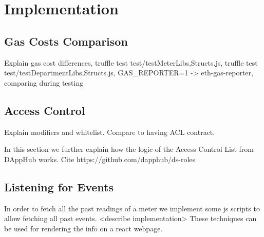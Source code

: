 \chapter{Implementation}

\section{Gas Costs Comparison}

Explain gas cost differences, truffle test test/testMeter{Libs,Structs}.js, truffle test test/testDepartment{Libs,Structs}.js, 
GAS_REPORTER=1 -> eth-gas-reporter, comparing during testing

\section{Access Control}\label{apx:implementation:acl}
Explain modifiers and whitelist. Compare to having ACL contract.

In this section we further explain how the logic of the Access Control List from DAppHub works. Cite  https://github.com/dapphub/ds-roles

\section{Listening for Events} \label{apx:implementation:events}

In order to fetch all the past readings of a meter we implement some js scripts to allow fetching all past events. <describe implementation>
These techniques can be used for rendering the info on a react webpage.
